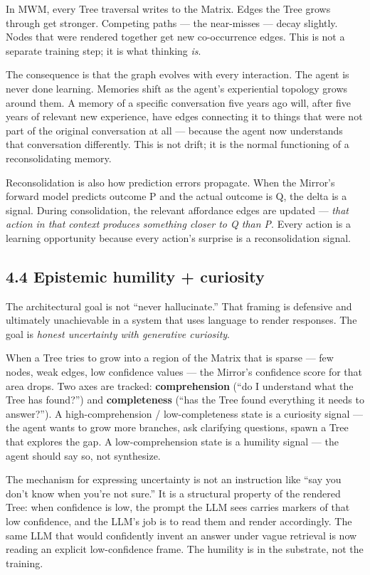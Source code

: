 \documentclass[12pt]{article}
\begin{document}
In MWM, every Tree traversal writes to the Matrix. Edges the Tree grows through get stronger. Competing paths --- the near-misses --- decay slightly. Nodes that were rendered together get new co-occurrence edges. This is not a separate training step; it is what thinking \emph{is}.

The consequence is that the graph evolves with every interaction. The agent is never done learning. Memories shift as the agent's experiential topology grows around them. A memory of a specific conversation five years ago will, after five years of relevant new experience, have edges connecting it to things that were not part of the original conversation at all --- because the agent now understands that conversation differently. This is not drift; it is the normal functioning of a reconsolidating memory.

Reconsolidation is also how prediction errors propagate. When the Mirror's forward model predicts outcome P and the actual outcome is Q, the delta is a signal. During consolidation, the relevant affordance edges are updated --- \emph{that action in that context produces something closer to Q than P}. Every action is a learning opportunity because every action's surprise is a reconsolidation signal.

\subsection{4.4 Epistemic humility + curiosity}\label{epistemic-humility-curiosity}

The architectural goal is not ``never hallucinate.'' That framing is defensive and ultimately unachievable in a system that uses language to render responses. The goal is \emph{honest uncertainty with generative curiosity}.

When a Tree tries to grow into a region of the Matrix that is sparse --- few nodes, weak edges, low confidence values --- the Mirror's confidence score for that area drops. Two axes are tracked: \textbf{comprehension} (``do I understand what the Tree has found?'') and \textbf{completeness} (``has the Tree found everything it needs to answer?''). A high-comprehension / low-completeness state is a curiosity signal --- the agent wants to grow more branches, ask clarifying questions, spawn a Tree that explores the gap. A low-comprehension state is a humility signal --- the agent should say so, not synthesize.

The mechanism for expressing uncertainty is not an instruction like ``say you don't know when you're not sure.'' It is a structural property of the rendered Tree: when confidence is low, the prompt the LLM sees carries markers of that low confidence, and the LLM's job is to read them and render accordingly. The same LLM that would confidently invent an answer under vague retrieval is now reading an explicit low-confidence frame. The humility is in the substrate, not the training.
\end{document}
